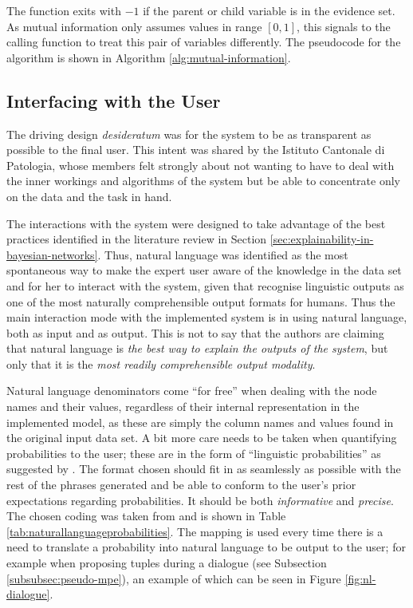 The function exits with $-1$ if the parent or child variable is in the evidence set.
As mutual information only assumes values in range $[0,1]$, this signals to the calling function to treat this pair of variables differently.
The pseudocode for the algorithm is shown in Algorithm \ref{alg:mutual-information}.

\subsection{Interfacing with the User} \label{subsec:interfacing-user}
The driving design \textit{desideratum} was for the system to be as transparent as possible to the final user.
This intent was shared by the Istituto Cantonale di Patologia, whose members felt strongly about not wanting to have to deal with the inner workings and algorithms of the system but be able to concentrate only on the data and the task in hand.

The interactions with the system were designed to take advantage of the best practices identified in the literature review in Section \ref{sec:explainability-in-bayesian-networks}.
Thus, natural language was identified as the most spontaneous way to make the expert user aware of the knowledge in the data set and for her to interact with the system, given that \citet{lacave2002review} recognise linguistic outputs as one of the most naturally comprehensible output formats for humans.
Thus the main interaction mode with the implemented system is in using natural language, both as input and as output.
This is not to say that the authors are claiming that natural language is \textit{the best way to explain the outputs of the system}, but only that it is the \textit{most readily comprehensible output modality}.

Natural language denominators come \enquote{for free} when dealing with the node names and their values, regardless of their internal representation in the implemented model, as these are simply the column names and values found in the original input data set.
A bit more care needs to be taken when quantifying probabilities to the user; these are in the form of \enquote{linguistic probabilities} as suggested by \citet{henrion1990qualtitative}.
The format chosen should fit in as seamlessly as possible with the rest of the phrases generated and be able to conform to the user's prior expectations regarding probabilities.
It should be both \textit{informative} and \textit{precise}.
The chosen coding was taken from \citet{Butz2018} and is shown in Table \ref{tab:naturallanguageprobabilities}.
The mapping is used every time there is a need to translate a probability into natural language to be output to the user; for example when proposing tuples during a dialogue (see Subsection \ref{subsubsec:pseudo-mpe}), an example of which can be seen in Figure \ref{fig:nl-dialogue}.

